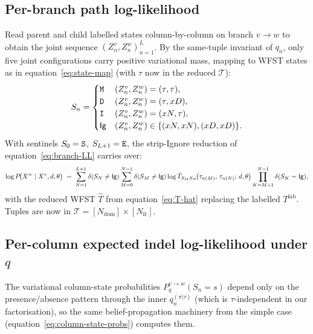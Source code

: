 \subsection{Per-branch path log-likelihood}
\label{sec:varanc-mixdom-pathLL}

Read parent and child labelled states column-by-column on branch
$v \to w$ to obtain the joint sequence
$(Z^v_n, Z^w_n)_{n=1}^L$. By the same-tuple invariant of $q_n$, only
five joint configurations carry positive variational mass, mapping
to WFST states as in equation~\eqref{eq:state-map} (with $\tau$ now
in the reduced $\mathcal{T}$):
\begin{equation}
\label{eq:state-map-mixdom-reduced}
S_n =
\begin{cases}
{\tt M} & (Z^v_n, Z^w_n) = (\tau, \tau), \\
{\tt D} & (Z^v_n, Z^w_n) = (\tau, x{D}), \\
{\tt I} & (Z^v_n, Z^w_n) = (x{N}, \tau), \\
\mathsf{Ig} & (Z^v_n, Z^w_n) \in \{(x{N},x{N}), (x{D}, x{D})\}.
\end{cases}
\end{equation}
With sentinels $S_0 = {\tt S}$, $S_{L+1} = {\tt E}$, the strip-Ignore
reduction of equation~\eqref{eq:branch-LL} carries over:
\begin{equation}
\label{eq:branch-LL-mixdom-reduced}
\log P\!\big(X^w \mid X^v, d, \theta\big)
\;=\; \sum_{N=1}^{L+1} \delta(S_N \neq \mathsf{Ig})
       \sum_{M=0}^{N-1} \delta(S_M \neq \mathsf{Ig})
         \log \hat{T}_{S_M S_N}\!\big(\tau_{n(M)},\, \tau_{n(N)};\, d, \theta\big)
         \prod_{K=M+1}^{N-1} \delta(S_K = \mathsf{Ig}),
\end{equation}
with the reduced WFST $\hat{T}$ from
equation~\eqref{eq:T-hat} replacing the labelled $T^{\text{lab}}$.
Tuples are now in $\mathcal{T} = [N_{\text{dom}}] \times [N_{\text{fr}}]$.

\subsection{\texorpdfstring{Per-column expected indel log-likelihood under $q$}{Per-column expected indel log-likelihood under q}}
\label{sec:varanc-mixdom-elbo-indel}

The variational column-state probabilities $P^{v\to w}_q(S_n = s)$
depend only on the presence/absence pattern through the inner
$q_n^{(\pi|\tau)}$ (which is $\tau$-independent in our factorisation),
so the same belief-propagation machinery from the simple case
(equation~\eqref{eq:column-state-probs}) computes them.

